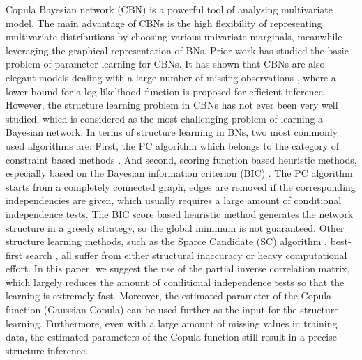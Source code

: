 Copula Bayesian network (CBN) is a powerful tool of analysing multivariate model. The main advantage of CBNs is the high flexibility of representing
multivariate distributions by choosing various univariate marginals, meanwhile leveraging the graphical representation of BNs.
Prior work \cite{ElidanCopula} has studied the basic problem of
parameter learning for CBNs. It has shown that CBNs are also elegant models dealing with a large number of missing observations \cite{ElidanInferenceLess}, where a lower bound for a log-likelihood function is proposed for efficient inference.
%
However, the structure learning problem in CBNs has not ever been very well studied, which is considered as the most challenging problem of learning a Bayesian network. %
In terms of structure learning in BNs, two most commonly used algorithms are: First, the PC algorithm \cite{pc_spirtes} which belongs to the category of constraint based methods \cite{Spirtes2000}. And second, scoring function based heuristic methods, especially based on the Bayesian information criterion (BIC) \cite{heckerman95}.
The PC algorithm starts from a completely connected graph, edges are removed if the corresponding independencies are given, which usually requires a large amount of conditional independence tests. The BIC score based heuristic method generates the network structure in a greedy strategy, so the global minimum is not guaranteed. %
%
Other structure learning methods, such as the Sparce Candidate (SC) algorithm \cite{Friedman99}, best-first search \cite{Korf93}, all suffer from either structural inaccuracy or heavy computational effort.
In this paper, we suggest the use of the partial inverse correlation matrix, which largely reduces the amount of conditional independence tests so that the learning is extremely fast. %
Moreover, the estimated parameter of the Copula function (Gaussian Copula) can be 
used further as the input for the structure learning.
%
Furthermore, even with a large amount of missing values in training data, the estimated parameters of the Copula function still result in a precise structure inference.
%
